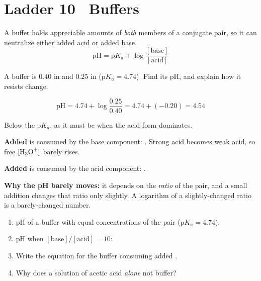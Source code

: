 \documentclass{apchem-worksheet}
\begin{document}
\section*{\sffamily Ladder 10 \textbullet\ Buffers}
  

A buffer holds appreciable amounts of \emph{both} members of a conjugate
pair, so it can neutralize either added acid or added base.
\[ \text{pH} = \mathrm{p}K_a +
   \log\frac{[\text{base}]}{[\text{acid}]} \]

\begin{workedexample}
A buffer is \SI{0.40}{\Molar} in  and \SI{0.25}{\Molar} in
 ($\mathrm{p}K_a = 4.74$). Find its pH, and explain how it
resists change.

\[ \text{pH} = 4.74 + \log\frac{0.25}{0.40} = 4.74 + (-0.20)
   = \mathbf{4.54} \]

Below the $\mathrm{p}K_a$, as it must be when the acid form dominates.

\textbf{Added } is consumed by the base component:
. Strong acid becomes weak acid, so free
$[\ce{H3O+}]$ barely rises.

\textbf{Added } is consumed by the acid component:
.

\textbf{Why the pH barely moves:} it depends on the \emph{ratio} of the
pair, and a small addition changes that ratio only slightly. A logarithm
of a slightly-changed ratio is a barely-changed number.
\end{workedexample}

\begin{yourturn}
\begin{enumerate}[leftmargin=*,itemsep=0.5em]
  \item pH of a buffer with equal concentrations of the pair
        ($\mathrm{p}K_a = 4.74$): \workspace[1.4cm]
  \item pH when $[\text{base}]/[\text{acid}] = 10$:
        \workspace[1.6cm]
  \item Write the equation for the buffer consuming added .
        \workspace[1.6cm]
  \item Why does a solution of acetic acid \emph{alone} not buffer?
        \workspace[1.8cm]
\end{enumerate}
\end{yourturn}
\end{document}
